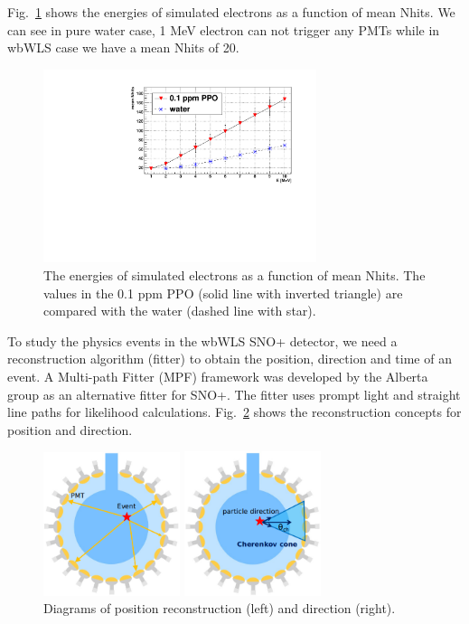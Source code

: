 \documentclass[preprint,12pt]{elsarticle}
\numberwithin{equation}{section}
\begin{document}
Fig.~\ref{nhit_wls} shows the energies of simulated electrons as a function of mean Nhits. We can see in pure water case, 1 MeV electron can not trigger any PMTs while in wbWLS case we have a mean Nhits of 20.

\begin{figure}[htbp]
	\centering	
	\includegraphics[width=8cm]{nhits_wls.pdf}
	\caption{ The energies of simulated electrons as a function of mean Nhits. The values in the 0.1 ppm PPO (solid line with inverted triangle) are compared with the water (dashed line with star).}
	\label{nhit_wls}
\end{figure}

To study the physics events in the wbWLS SNO+ detector, we need a reconstruction algorithm (fitter) to obtain the position, direction and time of an event. A Multi-path Fitter (MPF) framework was developed by the Alberta group as an alternative fitter for SNO+. The fitter uses prompt light and straight line paths for likelihood calculations. Fig.~\ref{mpwdiagram} shows the reconstruction concepts for position and direction. 

\begin{figure}[htbp]
	\centering
	\begin{minipage}[t]{0.4\textwidth}
		\centering
		\includegraphics[width=4cm]{mpwDiagram.png}
	\end{minipage}
	\begin{minipage}[t]{0.4\textwidth}
		\centering
		\includegraphics[width=4cm]{mpwDiagram2.png}
	\end{minipage}
	\caption{Diagrams of position reconstruction (left) and direction (right).}
	\label{mpwdiagram}
\end{figure}
\end{document}
